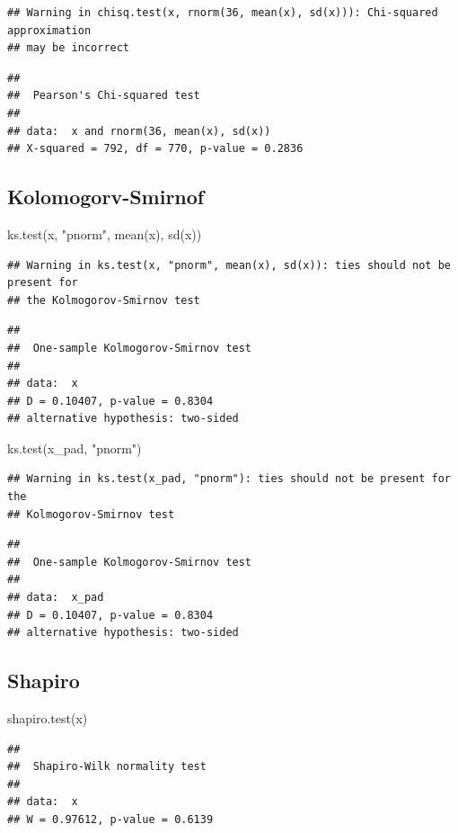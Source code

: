 \documentclass[
]{article}
\newenvironment{Shaded}{\begin{snugshade}}{\end{snugshade}}
\newcommand{\FunctionTok}[1]{\textcolor[rgb]{0.00,0.00,0.00}{#1}}
\newcommand{\NormalTok}[1]{#1}
\newcommand{\StringTok}[1]{\textcolor[rgb]{0.31,0.60,0.02}{#1}}
\begin{document}
\begin{verbatim}
## Warning in chisq.test(x, rnorm(36, mean(x), sd(x))): Chi-squared approximation
## may be incorrect
\end{verbatim}

\begin{verbatim}
## 
##  Pearson's Chi-squared test
## 
## data:  x and rnorm(36, mean(x), sd(x))
## X-squared = 792, df = 770, p-value = 0.2836
\end{verbatim}

\hypertarget{kolomogorv-smirnof}{%
\subsection{Kolomogorv-Smirnof}\label{kolomogorv-smirnof}}

\begin{Shaded}
\begin{Highlighting}[]
\FunctionTok{ks.test}\NormalTok{(x, }\StringTok{"pnorm"}\NormalTok{, }\FunctionTok{mean}\NormalTok{(x), }\FunctionTok{sd}\NormalTok{(x))}
\end{Highlighting}
\end{Shaded}

\begin{verbatim}
## Warning in ks.test(x, "pnorm", mean(x), sd(x)): ties should not be present for
## the Kolmogorov-Smirnov test
\end{verbatim}

\begin{verbatim}
## 
##  One-sample Kolmogorov-Smirnov test
## 
## data:  x
## D = 0.10407, p-value = 0.8304
## alternative hypothesis: two-sided
\end{verbatim}

\begin{Shaded}
\begin{Highlighting}[]
\FunctionTok{ks.test}\NormalTok{(x\_pad, }\StringTok{"pnorm"}\NormalTok{)}
\end{Highlighting}
\end{Shaded}

\begin{verbatim}
## Warning in ks.test(x_pad, "pnorm"): ties should not be present for the
## Kolmogorov-Smirnov test
\end{verbatim}

\begin{verbatim}
## 
##  One-sample Kolmogorov-Smirnov test
## 
## data:  x_pad
## D = 0.10407, p-value = 0.8304
## alternative hypothesis: two-sided
\end{verbatim}

\hypertarget{shapiro}{%
\subsection{Shapiro}\label{shapiro}}

\begin{Shaded}
\begin{Highlighting}[]
\FunctionTok{shapiro.test}\NormalTok{(x)}
\end{Highlighting}
\end{Shaded}

\begin{verbatim}
## 
##  Shapiro-Wilk normality test
## 
## data:  x
## W = 0.97612, p-value = 0.6139
\end{verbatim}
\end{document}
